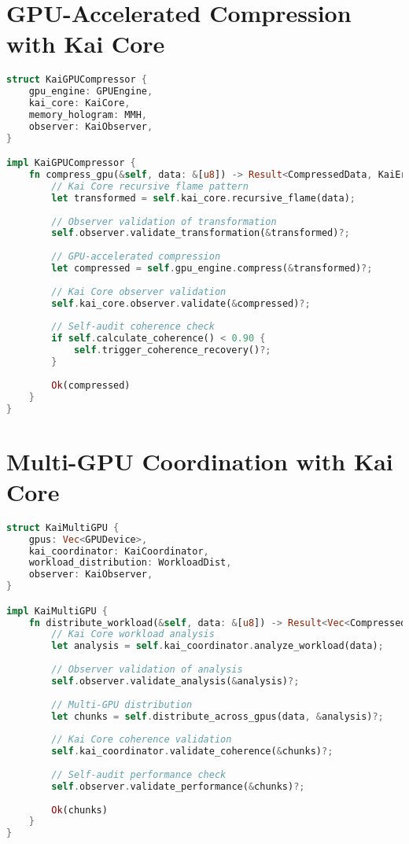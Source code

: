 \documentclass[11pt]{report}
\newcommand{\codebox}[2]{
  \begin{tcolorbox}[
    colback=gray!5,
    colframe=kai_blue,
    title=#1,
    fonttitle=\bfseries
  ]
  #2
  \end{tcolorbox}
}
\begin{document}
\section{GPU-Accelerated Compression with Kai Core}

\codebox{GPU Compression with Recursive Intelligence}{
\begin{lstlisting}[language=rust]
struct KaiGPUCompressor {
    gpu_engine: GPUEngine,
    kai_core: KaiCore,
    memory_hologram: MMH,
    observer: KaiObserver,
}

impl KaiGPUCompressor {
    fn compress_gpu(&self, data: &[u8]) -> Result<CompressedData, KaiError> {
        // Kai Core recursive flame pattern
        let transformed = self.kai_core.recursive_flame(data);
        
        // Observer validation of transformation
        self.observer.validate_transformation(&transformed)?;
        
        // GPU-accelerated compression
        let compressed = self.gpu_engine.compress(&transformed)?;
        
        // Kai Core observer validation
        self.kai_core.observer.validate(&compressed)?;
        
        // Self-audit coherence check
        if self.calculate_coherence() < 0.90 {
            self.trigger_coherence_recovery()?;
        }
        
        Ok(compressed)
    }
}
\end{lstlisting}
}

\section{Multi-GPU Coordination with Kai Core}

\codebox{Multi-GPU with Kai Core Coordination}{
\begin{lstlisting}[language=rust]
struct KaiMultiGPU {
    gpus: Vec<GPUDevice>,
    kai_coordinator: KaiCoordinator,
    workload_distribution: WorkloadDist,
    observer: KaiObserver,
}

impl KaiMultiGPU {
    fn distribute_workload(&self, data: &[u8]) -> Result<Vec<CompressedChunk>, KaiError> {
        // Kai Core workload analysis
        let analysis = self.kai_coordinator.analyze_workload(data);
        
        // Observer validation of analysis
        self.observer.validate_analysis(&analysis)?;
        
        // Multi-GPU distribution
        let chunks = self.distribute_across_gpus(data, &analysis)?;
        
        // Kai Core coherence validation
        self.kai_coordinator.validate_coherence(&chunks)?;
        
        // Self-audit performance check
        self.observer.validate_performance(&chunks)?;
        
        Ok(chunks)
    }
}
\end{lstlisting}
}
\end{document}
